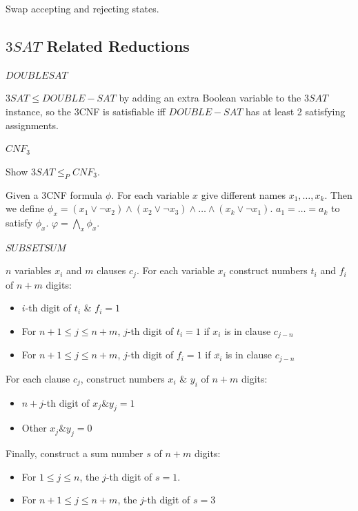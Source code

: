 \documentclass[10pt,landscape,a4paper]{article}
\begin{document}
\begin{multicols*}{3}
Swap accepting and rejecting states.

\subsection{$3SAT$ Related Reductions}

\underline{$DOUBLESAT$}

$3SAT \leq DOUBLE-SAT$ by adding an extra Boolean variable to the $3SAT$ instance, so the 3CNF is satisfiable iff $DOUBLE-SAT$ has at least 2 satisfying assignments.

\underline{$CNF_3$}

Show $3SAT \leq_P CNF_3$.

Given a 3CNF formula $\phi$. For each variable $x$ give different names $x_1, \ldots, x_k$. Then we define $\phi_x = (x_1 \vee \neg x_2) \wedge (x_2 \vee \neg x_3) \wedge \ldots \wedge (x_k \vee \neg x_1)$. $a_1 = \ldots = a_k$ to satisfy $\phi_x$. $\varphi = \bigwedge_x \phi_x$.

\underline{$SUBSETSUM$}

$n$ variables $x_i$ and $m$ clauses $c_j$. For each variable $x_i$ construct numbers $t_i$ and $f_i$ of $n + m$ digits:

\begin{itemize}
    \item $i$-th digit of $t_i$ \& $f_i = 1$
    \item For $n + 1 \leq j \leq n + m$, $j$-th digit of $t_i = 1$ if $x_i$ is in clause $c_{j-n}$
    \item For $n + 1 \leq j \leq n + m$, $j$-th digit of $f_i = 1$ if $\overline{x_i}$ is in clause $c_{j-n}$
\end{itemize}

For each clause $c_j$, construct numbers $x_i$ \& $y_i$ of $n + m$ digits:

\begin{itemize}
    \item $n+j$-th digit of $x_j \& y_j = 1$
    \item Other $x_j \& y_j = 0$
\end{itemize}

Finally, construct a sum number $s$ of $n + m$ digits:

\begin{itemize}
    \item For $1 \leq j \leq n$, the $j$-th digit of $s = 1$.
    \item For $n + 1 \leq j \leq n + m$, the $j$-th digit of $s = 3$
\end{itemize}


\end{multicols*}
\end{document}
